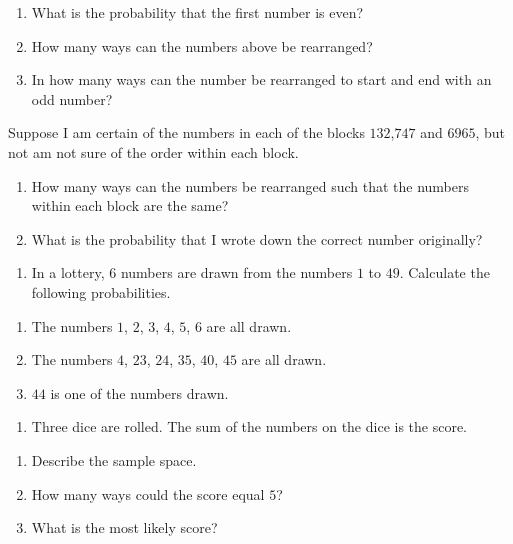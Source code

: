 \documentclass[
]{book}
\providecommand{\tightlist}{%
  \setlength{\itemsep}{0pt}\setlength{\parskip}{0pt}}
\theoremstyle{definition}
\theoremstyle{definition}
\theoremstyle{definition}
\theoremstyle{definition}
\theoremstyle{remark}
\begin{document}
\begin{enumerate}
\def\labelenumi{\alph{enumi})}
\item
  What is the probability that the first number is even?
\item
  How many ways can the numbers above be rearranged?
\item
  In how many ways can the number be rearranged to start and end with an odd number?
\end{enumerate}

Suppose I am certain of the numbers in each of the blocks \(132\),\(747\) and \(6965\), but not am not sure of the order within each block.

\begin{enumerate}
\def\labelenumi{\alph{enumi})}
\setcounter{enumi}{2}
\item
  How many ways can the numbers be rearranged such that the numbers within each block are the same?
\item
  What is the probability that I wrote down the correct number originally?
\end{enumerate}

\begin{enumerate}
\def\labelenumi{\arabic{enumi}.}
\setcounter{enumi}{1}
\tightlist
\item
  In a lottery, \(6\) numbers are drawn from the numbers \(1\) to \(49\). Calculate the following probabilities.
\end{enumerate}

\begin{enumerate}
\def\labelenumi{\alph{enumi})}
\item
  The numbers \(1\), \(2\), \(3\), \(4\), \(5\), \(6\) are all drawn.
\item
  The numbers \(4\), \(23\), \(24\), \(35\), \(40\), \(45\) are all drawn.
\item
  \(44\) is one of the numbers drawn.
\end{enumerate}

\begin{enumerate}
\def\labelenumi{\arabic{enumi}.}
\setcounter{enumi}{2}
\tightlist
\item
  Three dice are rolled. The sum of the numbers on the dice is the score.
\end{enumerate}

\begin{enumerate}
\def\labelenumi{\alph{enumi})}
\item
  Describe the sample space.
\item
  How many ways could the score equal \(5\)?
\item
  What is the most likely score?
\end{enumerate}
\end{document}
